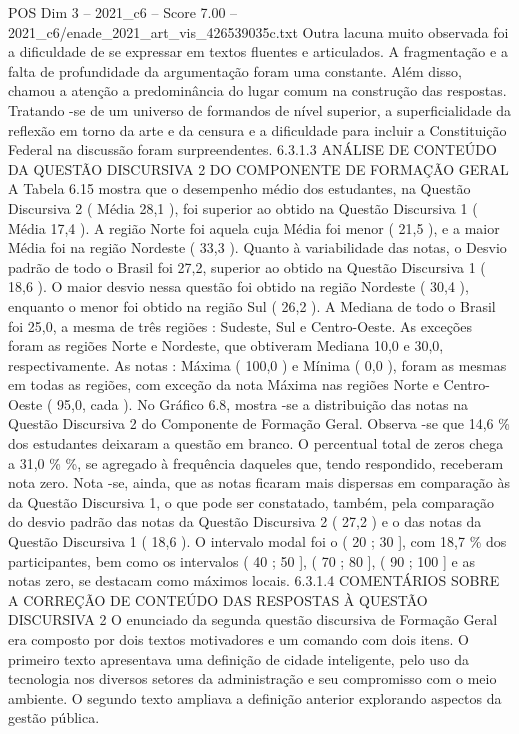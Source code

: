 \begin{textsample}{POS Dim 3 – 2021\_c6 – Score 7.00 – 2021\_c6/enade\_2021\_art\_vis\_426539035c.txt}
Outra lacuna muito observada foi a dificuldade de se expressar em textos fluentes e articulados.
A fragmentação e a falta de profundidade da argumentação foram uma constante.
Além disso, chamou a atenção a predominância do lugar comum na construção das respostas.
Tratando -se de um universo de formandos de nível superior, a superficialidade da reflexão em torno da arte e da censura e a dificuldade para incluir a Constituição Federal na discussão foram surpreendentes. 6.3.1.3 ANÁLISE DE CONTEÚDO DA QUESTÃO DISCURSIVA 2 DO COMPONENTE DE FORMAÇÃO GERAL A Tabela 6.15 mostra que o desempenho médio dos estudantes, na Questão Discursiva 2 ( Média 28,1 ), foi superior ao obtido na Questão Discursiva 1 ( Média 17,4 ).
A região Norte foi aquela cuja Média foi menor ( 21,5 ), e a maior Média foi na região Nordeste ( 33,3 ).
Quanto à variabilidade das notas, o Desvio padrão de todo o Brasil foi 27,2, superior ao obtido na Questão Discursiva 1 ( 18,6 ).
O maior desvio nessa questão foi obtido na região Nordeste ( 30,4 ), enquanto o menor foi obtido na região Sul ( 26,2 ).
A Mediana de todo o Brasil foi 25,0, a mesma de três regiões : Sudeste, Sul e Centro-Oeste.
As exceções foram as regiões Norte e Nordeste, que obtiveram Mediana 10,0 e 30,0, respectivamente.
As notas : Máxima ( 100,0 ) e Mínima ( 0,0 ), foram as mesmas em todas as regiões, com exceção da nota Máxima nas regiões Norte e Centro-Oeste ( 95,0, cada ).
No Gráfico 6.8, mostra -se a distribuição das notas na Questão Discursiva 2 do Componente de Formação Geral.
Observa -se que 14,6 \% dos estudantes deixaram a questão em branco.
O percentual total de zeros chega a 31,0 \% \%, se agregado à frequência daqueles que, tendo respondido, receberam nota zero.
Nota -se, ainda, que as notas ficaram mais dispersas em comparação às da Questão Discursiva 1, o que pode ser constatado, também, pela comparação do desvio padrão das notas da Questão Discursiva 2 ( 27,2 ) e o das notas da Questão Discursiva 1 ( 18,6 ).
O intervalo modal foi o ( 20 ; 30 ], com 18,7 \% dos participantes, bem como os intervalos ( 40 ; 50 ], ( 70 ; 80 ], ( 90 ; 100 ] e as notas zero, se destacam como máximos locais. 6.3.1.4 COMENTÁRIOS SOBRE A CORREÇÃO DE CONTEÚDO DAS RESPOSTAS À QUESTÃO DISCURSIVA 2 O enunciado da segunda questão discursiva de Formação Geral era composto por dois textos motivadores e um comando com dois itens.
O primeiro texto apresentava uma definição de cidade inteligente, pelo uso da tecnologia nos diversos setores da administração e seu compromisso com o meio ambiente.
O segundo texto ampliava a definição anterior explorando aspectos da gestão pública.

\end{textsample}
